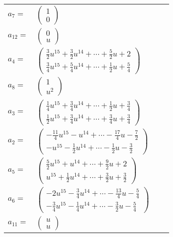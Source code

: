 \documentclass[1p]{elsarticle_modified}
\theoremstyle{definition}
\begin{document}
\begin{tabular}{m{7pt} m{180pt} m{7pt} m{180pt} }
\flushright $a_{7}=$&$\begin{pmatrix}1\\0\end{pmatrix}$ \\
\flushright $a_{12}=$&$\begin{pmatrix}0\\u\end{pmatrix}$ \\
\flushright $a_{4}=$&$\begin{pmatrix}\frac{3}{2} u^{15}+\frac{3}{2} u^{14}+\cdots+\frac{5}{2} u+2\\\frac{3}{4} u^{15}+\frac{5}{4} u^{14}+\cdots+\frac{1}{2} u+\frac{5}{4}\end{pmatrix}$ \\
\flushright $a_{8}=$&$\begin{pmatrix}1\\u^2\end{pmatrix}$ \\
\flushright $a_{3}=$&$\begin{pmatrix}\frac{1}{4} u^{15}+\frac{3}{4} u^{14}+\cdots+\frac{1}{2} u+\frac{3}{4}\\\frac{1}{2} u^{15}+\frac{3}{4} u^{14}+\cdots+\frac{3}{4} u+\frac{3}{4}\end{pmatrix}$ \\
\flushright $a_{2}=$&$\begin{pmatrix}-\frac{11}{4} u^{15}- u^{14}+\cdots-\frac{17}{4} u-\frac{7}{2}\\- u^{15}-\frac{1}{2} u^{14}+\cdots-\frac{1}{2} u-\frac{3}{2}\end{pmatrix}$ \\
\flushright $a_{5}=$&$\begin{pmatrix}\frac{5}{2} u^{15}+u^{14}+\cdots+\frac{9}{2} u+2\\u^{15}+\frac{1}{2} u^{14}+\cdots+\frac{3}{2} u+\frac{3}{2}\end{pmatrix}$ \\
\flushright $a_{6}=$&$\begin{pmatrix}-2 u^{15}-\frac{3}{4} u^{14}+\cdots-\frac{13}{4} u-\frac{5}{4}\\-\frac{3}{4} u^{15}-\frac{1}{4} u^{14}+\cdots-\frac{3}{2} u-\frac{5}{4}\end{pmatrix}$ \\
\flushright $a_{11}=$&$\begin{pmatrix}u\\u\end{pmatrix}$ \\

\end{tabular}
\end{document}
